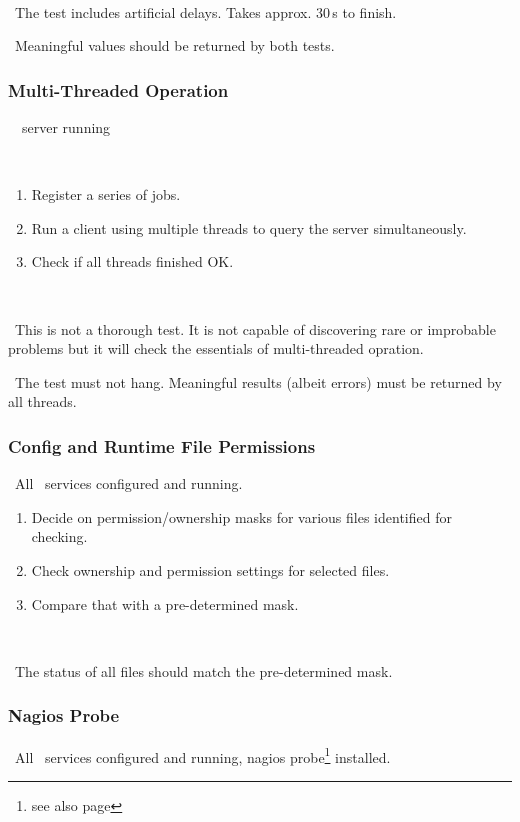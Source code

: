 \how\ 

\note\ The test includes artificial delays. Takes approx. 30\,s to finish.

\result\ Meaningful values should be returned by both tests. 

\subsubsection{Multi-Threaded Operation}

\req\ \LB\ server running

\what\
\begin{enumerate}
\item Register a series of jobs.
\item Run a client using multiple threads to query the server simultaneously.
\item Check if all threads finished OK.
\end{enumerate}

\how\ 

\note\ This is not a thorough test. It is not capable of discovering rare or improbable problems but it will check the essentials of multi-threaded opration.

\result\ The test must not hang. Meaningful results (albeit errors) must be returned by all threads.

\subsubsection{Config and Runtime File Permissions}
\label{permissions}
\req\ All \LB\ services configured and running.

\what
\begin{enumerate}
\item Decide on permission/ownership masks for various files identified for checking.
\item Check ownership and permission settings for selected files.
\item Compare that with a pre-determined mask.
\end{enumerate}

\how\ 

\result\ The status of all files should match the pre-determined mask.


\subsubsection{Nagios Probe}
\label{permissions}
\req\ All \LB\ services configured and running, nagios probe\footnote{see also page \pageref{s:nagios}} installed.

